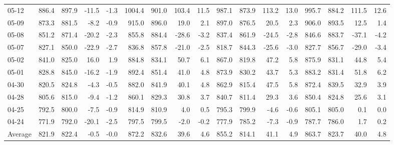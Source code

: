 \begin{threeparttable}
{\begin{tabular}{lrrrrrrrrrrrrrrrr}
  05-12 & 886.4 & 897.9 &      -11.5 &           -1.3 & 1004.4 & 901.0 &      103.4 &           11.5 &  987.1 & 873.9 &      113.2 &           13.0 &  995.7 &  884.2 &       111.5 &             12.6 \\
  05-09 & 873.3 & 881.5 &       -8.2 &           -0.9 &  915.0 & 896.0 &       19.0 &            2.1 &  897.0 & 876.5 &       20.5 &            2.3 &  906.0 &  893.5 &        12.5 &              1.4 \\
  05-08 & 851.2 & 871.4 &      -20.2 &           -2.3 &  855.8 & 884.4 &      -28.6 &           -3.2 &  837.4 & 861.9 &      -24.5 &           -2.8 &  846.6 &  883.7 &       -37.1 &             -4.2 \\
  05-07 & 827.1 & 850.0 &      -22.9 &           -2.7 &  836.8 & 857.8 &      -21.0 &           -2.5 &  818.7 & 844.3 &      -25.6 &           -3.0 &  827.7 &  856.7 &       -29.0 &             -3.4 \\
  05-02 & 841.0 & 825.0 &       16.0 &            1.9 &  884.8 & 834.1 &       50.7 &            6.1 &  867.0 & 819.8 &       47.2 &            5.8 &  875.9 &  831.1 &        44.8 &              5.4 \\
  05-01 & 828.8 & 845.0 &      -16.2 &           -1.9 &  892.4 & 851.4 &       41.0 &            4.8 &  873.9 & 830.2 &       43.7 &            5.3 &  883.2 &  831.4 &        51.8 &              6.2 \\
  04-30 & 820.5 & 824.8 &       -4.3 &           -0.5 &  882.0 & 841.9 &       40.1 &            4.8 &  862.9 & 815.4 &       47.5 &            5.8 &  872.4 &  839.5 &        32.9 &              3.9 \\
  04-28 & 805.6 & 815.0 &       -9.4 &           -1.2 &  860.1 & 829.3 &       30.8 &            3.7 &  840.7 & 811.4 &       29.3 &            3.6 &  850.4 &  824.8 &        25.6 &              3.1 \\
  04-25 & 792.5 & 800.0 &       -7.5 &           -0.9 &  814.9 & 810.9 &        4.0 &            0.5 &  795.3 & 799.9 &       -4.6 &           -0.6 &  805.1 &  805.0 &         0.1 &              0.0 \\
  04-24 & 771.9 & 792.0 &      -20.1 &           -2.5 &  797.5 & 799.5 &       -2.0 &           -0.2 &  777.9 & 785.2 &       -7.3 &           -0.9 &  787.7 &  786.0 &         1.7 &              0.2 \\
Average & 821.9 & 822.4 &       -0.5 &           -0.0 &  872.2 & 832.6 &       39.6 &            4.6 &  855.2 & 814.1 &       41.1 &            4.9 &  863.7 &  823.7 &        40.0 &              4.8 \\

\end{tabular}}
\end{threeparttable}

